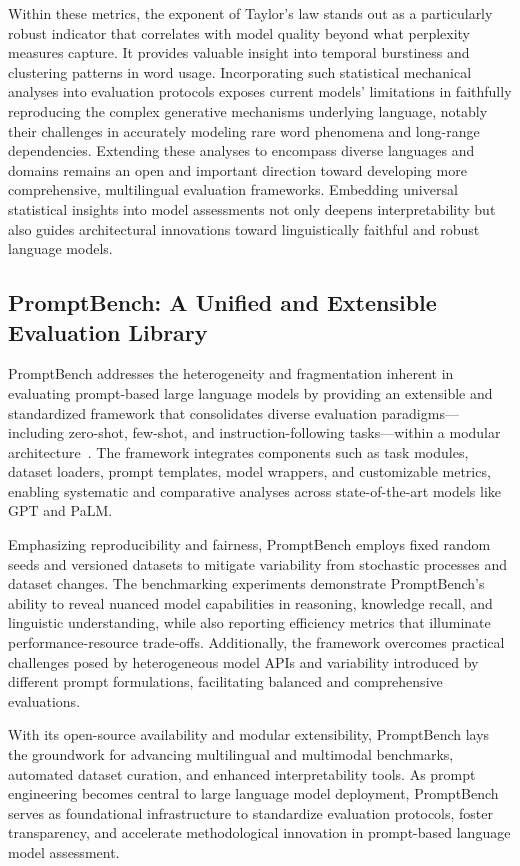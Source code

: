\documentclass[sigconf]{acmart}
\begin{document}
Within these metrics, the exponent of Taylor’s law stands out as a particularly robust indicator that correlates with model quality beyond what perplexity measures capture. It provides valuable insight into temporal burstiness and clustering patterns in word usage. Incorporating such statistical mechanical analyses into evaluation protocols exposes current models’ limitations in faithfully reproducing the complex generative mechanisms underlying language, notably their challenges in accurately modeling rare word phenomena and long-range dependencies. Extending these analyses to encompass diverse languages and domains remains an open and important direction toward developing more comprehensive, multilingual evaluation frameworks. Embedding universal statistical insights into model assessments not only deepens interpretability but also guides architectural innovations toward linguistically faithful and robust language models.

\subsection{PromptBench: A Unified and Extensible Evaluation Library}

PromptBench addresses the heterogeneity and fragmentation inherent in evaluating prompt-based large language models by providing an extensible and standardized framework that consolidates diverse evaluation paradigms—including zero-shot, few-shot, and instruction-following tasks—within a modular architecture~\cite{ref6}. The framework integrates components such as task modules, dataset loaders, prompt templates, model wrappers, and customizable metrics, enabling systematic and comparative analyses across state-of-the-art models like GPT and PaLM.

Emphasizing reproducibility and fairness, PromptBench employs fixed random seeds and versioned datasets to mitigate variability from stochastic processes and dataset changes. The benchmarking experiments demonstrate PromptBench's ability to reveal nuanced model capabilities in reasoning, knowledge recall, and linguistic understanding, while also reporting efficiency metrics that illuminate performance-resource trade-offs. Additionally, the framework overcomes practical challenges posed by heterogeneous model APIs and variability introduced by different prompt formulations, facilitating balanced and comprehensive evaluations.

With its open-source availability and modular extensibility, PromptBench lays the groundwork for advancing multilingual and multimodal benchmarks, automated dataset curation, and enhanced interpretability tools. As prompt engineering becomes central to large language model deployment, PromptBench serves as foundational infrastructure to standardize evaluation protocols, foster transparency, and accelerate methodological innovation in prompt-based language model assessment.
\end{document}
